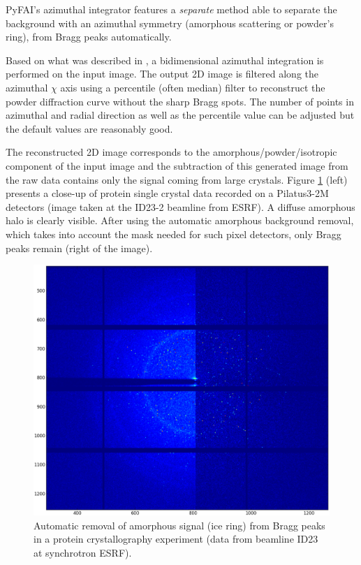\documentclass[preprint]{iucr}
\begin{document}
PyFAI's azimuthal integrator features a \textit{separate} method able to separate
the background with an azimuthal symmetry (amorphous scattering or powder's
ring), from Bragg peaks automatically.

Based on what was described in \cite{PyFAI_PDJ}, a bidimensional azimuthal
integration is performed on the input image.
The output 2D image is filtered along the azimuthal $\chi$ axis using a
percentile (often median) filter to reconstruct the powder diffraction curve
without the sharp Bragg spots.
The number of points in azimuthal and radial direction as well as
the percentile value can be adjusted but the default values are reasonably
good.

The reconstructed 2D image corresponds to the amorphous/powder/isotropic
component of the input image and the subtraction of this generated image from
the raw data contains only the signal coming from large crystals.
Figure \ref{separate} (left)
presents a close-up of protein single crystal data recorded on a Pilatus3-2M
detectors (image taken at the ID23-2 beamline from ESRF). A
diffuse amorphous halo is clearly visible.
After using the automatic amorphous background removal, which takes into account
the mask needed for such pixel detectors, only Bragg peaks remain (right of
the image).

\begin{figure}
\label{separate}
\begin{center}
\includegraphics[width=15cm]{separate_id23.eps}
\caption{Automatic removal of amorphous signal (ice ring) from Bragg peaks in a
protein crystallography experiment (data from beamline ID23 at synchrotron
ESRF).}
\end{center}
\end{figure}
\end{document}
